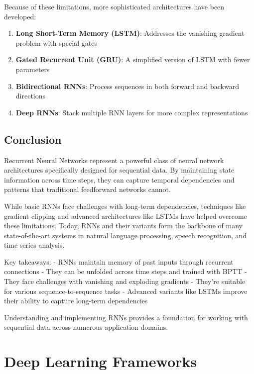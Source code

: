 \documentclass[
  letterpaper,
  DIV=11,
  numbers=noendperiod]{scrreprt}
\providecommand{\tightlist}{%
  \setlength{\itemsep}{0pt}\setlength{\parskip}{0pt}}\usepackage{longtable,booktabs,array}
\begin{document}
Because of these limitations, more sophisticated architectures have been
developed:

\begin{enumerate}
\def\labelenumi{\arabic{enumi}.}
\tightlist
\item
  \textbf{Long Short-Term Memory (LSTM)}: Addresses the vanishing
  gradient problem with special gates
\item
  \textbf{Gated Recurrent Unit (GRU)}: A simplified version of LSTM with
  fewer parameters
\item
  \textbf{Bidirectional RNNs}: Process sequences in both forward and
  backward directions
\item
  \textbf{Deep RNNs}: Stack multiple RNN layers for more complex
  representations
\end{enumerate}

\subsection{Conclusion}\label{conclusion-5}

Recurrent Neural Networks represent a powerful class of neural network
architectures specifically designed for sequential data. By maintaining
state information across time steps, they can capture temporal
dependencies and patterns that traditional feedforward networks cannot.

While basic RNNs face challenges with long-term dependencies, techniques
like gradient clipping and advanced architectures like LSTMs have helped
overcome these limitations. Today, RNNs and their variants form the
backbone of many state-of-the-art systems in natural language
processing, speech recognition, and time series analysis.

Key takeaways: - RNNs maintain memory of past inputs through recurrent
connections - They can be unfolded across time steps and trained with
BPTT - They face challenges with vanishing and exploding gradients -
They're suitable for various sequence-to-sequence tasks - Advanced
variants like LSTMs improve their ability to capture long-term
dependencies

Understanding and implementing RNNs provides a foundation for working
with sequential data across numerous application domains.

\section{Deep Learning Frameworks}\label{deep-learning-frameworks}
\end{document}
